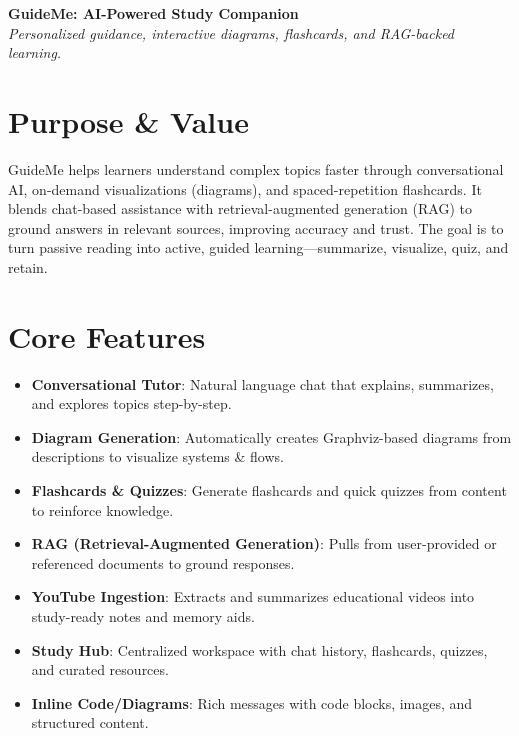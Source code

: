 \documentclass[11pt]{article}
\begin{document}
{\LARGE \textbf{GuideMe: AI-Powered Study Companion}}\\[-0.2em]
\textit{Personalized guidance, interactive diagrams, flashcards, and RAG-backed learning.}\\[0.6em]

\section*{Purpose \& Value}
GuideMe helps learners understand complex topics faster through conversational AI, on-demand visualizations (diagrams), and spaced-repetition flashcards. It blends chat-based assistance with retrieval-augmented generation (RAG) to ground answers in relevant sources, improving accuracy and trust. The goal is to turn passive reading into active, guided learning—summarize, visualize, quiz, and retain.

\section*{Core Features}
\begin{itemize}
  \item \textbf{Conversational Tutor}: Natural language chat that explains, summarizes, and explores topics step-by-step.
  \item \textbf{Diagram Generation}: Automatically creates Graphviz-based diagrams from descriptions to visualize systems \& flows.
  \item \textbf{Flashcards \& Quizzes}: Generate flashcards and quick quizzes from content to reinforce knowledge.
  \item \textbf{RAG (Retrieval-Augmented Generation)}: Pulls from user-provided or referenced documents to ground responses.
  \item \textbf{YouTube Ingestion}: Extracts and summarizes educational videos into study-ready notes and memory aids.
  \item \textbf{Study Hub}: Centralized workspace with chat history, flashcards, quizzes, and curated resources.
  \item \textbf{Inline Code/Diagrams}: Rich messages with code blocks, images, and structured content.
\end{itemize}
\end{document}
